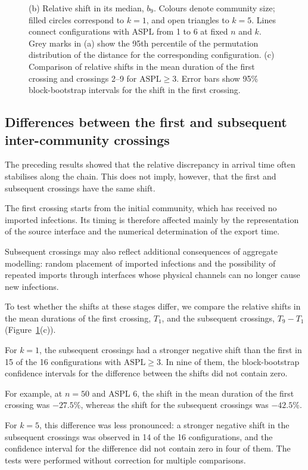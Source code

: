 \begin{figure}[tbp]
{(b) Relative shift in its median, $b_9$.
Colours denote community size; filled circles correspond to $k=1$, and open triangles to $k=5$.
Lines connect configurations with ASPL from 1 to 6 at fixed $n$ and $k$. Grey marks in (a) show the 95th percentile of the permutation distribution of the distance for the corresponding configuration.
(c) Comparison of relative shifts in the mean duration of the first crossing and crossings 2--9 for $\mathrm{ASPL}\geq3$.
Error bars show 95\% block-bootstrap intervals for the shift in the first crossing.
}
\label{fig:descriptor}
\end{figure}


\subsection{Differences between the first and subsequent inter-community crossings}

The preceding results showed that the relative discrepancy in arrival time often stabilises along the chain. This does not imply, however, that the first and subsequent crossings have the same shift.

The first crossing starts from the initial community, which has received no imported infections. Its timing is therefore affected mainly by the representation of the source interface and the numerical determination of the export time.

Subsequent crossings may also reflect additional consequences of aggregate modelling: random placement of imported infections and the possibility of repeated imports through interfaces whose physical channels can no longer cause new infections.

To test whether the shifts at these stages differ, we compare the relative shifts in the mean durations of the first crossing, $T_1$, and the subsequent crossings, $T_9-T_1$ (Figure~\ref{fig:descriptor}(c)).

For $k=1$, the subsequent crossings had a stronger negative shift than the first in 15 of the 16 configurations with $\mathrm{ASPL}\geq3$. In nine of them, the block-bootstrap confidence intervals for the difference between the shifts did not contain zero.

For example, at $n=50$ and ASPL 6, the shift in the mean duration of the first crossing was $-27.5\%$, whereas the shift for the subsequent crossings was $-42.5\%$.

For $k=5$, this difference was less pronounced: a stronger negative shift in the subsequent crossings was observed in 14 of the 16 configurations, and the confidence interval for the difference did not contain zero in four of them. The tests were performed without correction for multiple comparisons.

